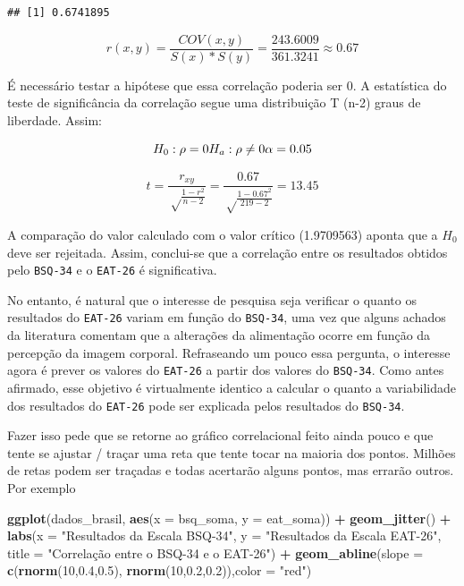 \documentclass[
]{book}
\newenvironment{Shaded}{\begin{snugshade}}{\end{snugshade}}
\newcommand{\DataTypeTok}[1]{\textcolor[rgb]{0.13,0.29,0.53}{#1}}
\newcommand{\DecValTok}[1]{\textcolor[rgb]{0.00,0.00,0.81}{#1}}
\newcommand{\FloatTok}[1]{\textcolor[rgb]{0.00,0.00,0.81}{#1}}
\newcommand{\KeywordTok}[1]{\textcolor[rgb]{0.13,0.29,0.53}{\textbf{#1}}}
\newcommand{\NormalTok}[1]{#1}
\newcommand{\OperatorTok}[1]{\textcolor[rgb]{0.81,0.36,0.00}{\textbf{#1}}}
\newcommand{\StringTok}[1]{\textcolor[rgb]{0.31,0.60,0.02}{#1}}
\begin{document}
\begin{verbatim}
## [1] 0.6741895
\end{verbatim}

\[r(x,y) = \frac{COV(x,y)}{S(x)*S(y)} = \frac{243.6009}{361.3241} \approx 0.67\]

É necessário testar a hipótese que essa correlação poderia ser 0. A estatística do teste de significância da correlação segue uma distribuição T (n-2) graus de liberdade. Assim:

\[H_{0}: \rho = 0 \\ H_{a}: \rho \neq 0 \\ \alpha = 0.05\]

\[t = \frac{r_{xy}}{\sqrt\frac{1-r^2}{n-2}} = \frac{0.67}{\sqrt\frac{1-0.67^2}{219-2}} = 13.45\]

A comparação do valor calculado com o valor crítico (1.9709563) aponta que a \(H_0\) deve ser rejeitada. Assim, conclui-se que a correlação entre os resultados obtidos pelo \texttt{BSQ-34} e o \texttt{EAT-26} é significativa.

No entanto, é natural que o interesse de pesquisa seja verificar o quanto os resultados do \texttt{EAT-26} variam em função do \texttt{BSQ-34}, uma vez que alguns achados da literatura comentam que a alterações da alimentação ocorre em função da percepção da imagem corporal. Refraseando um pouco essa pergunta, o interesse agora é prever os valores do \texttt{EAT-26} a partir dos valores do \texttt{BSQ-34}. Como antes afirmado, esse objetivo é virtualmente identico a calcular o quanto a variabilidade dos resultados do \texttt{EAT-26} pode ser explicada pelos resultados do \texttt{BSQ-34}.

Fazer isso pede que se retorne ao gráfico correlacional feito ainda pouco e que tente se ajustar / traçar uma reta que tente tocar na maioria dos pontos. Milhões de retas podem ser traçadas e todas acertarão alguns pontos, mas errarão outros. Por exemplo

\begin{Shaded}
\begin{Highlighting}[]
\KeywordTok{ggplot}\NormalTok{(dados_brasil, }\KeywordTok{aes}\NormalTok{(}\DataTypeTok{x =}\NormalTok{ bsq_soma, }\DataTypeTok{y =}\NormalTok{ eat_soma)) }\OperatorTok{+}
\StringTok{  }\KeywordTok{geom_jitter}\NormalTok{() }\OperatorTok{+}
\StringTok{  }\KeywordTok{labs}\NormalTok{(}\DataTypeTok{x =} \StringTok{"Resultados da Escala BSQ-34"}\NormalTok{, }\DataTypeTok{y =} \StringTok{"Resultados da Escala EAT-26"}\NormalTok{, }
       \DataTypeTok{title =} \StringTok{"Correlação entre o BSQ-34 e o EAT-26"}\NormalTok{) }\OperatorTok{+}
\StringTok{  }\KeywordTok{geom_abline}\NormalTok{(}\DataTypeTok{slope =} \KeywordTok{c}\NormalTok{(}\KeywordTok{rnorm}\NormalTok{(}\DecValTok{10}\NormalTok{,}\FloatTok{0.4}\NormalTok{,}\FloatTok{0.5}\NormalTok{), }\KeywordTok{rnorm}\NormalTok{(}\DecValTok{10}\NormalTok{,}\FloatTok{0.2}\NormalTok{,}\FloatTok{0.2}\NormalTok{)),}\DataTypeTok{color =} \StringTok{"red"}\NormalTok{)}
\end{Highlighting}
\end{Shaded}
\end{document}
